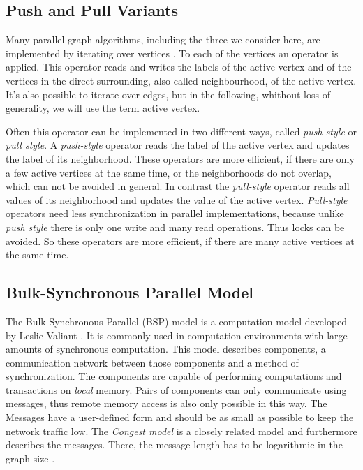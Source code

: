 \subsection{Push and Pull Variants}
Many parallel graph algorithms, including the three we consider here, are implemented by iterating over vertices \cite{tao}.
To each of the vertices an operator is applied.
This operator reads and writes the labels of the active vertex and of the vertices in the direct surrounding, also called neighbourhood, of the active vertex.
It's also possible to iterate over edges, but in the following, whithout loss of generality, we will use the term active vertex.

Often this operator can be implemented in two different ways, called \emph{push style} or \emph{pull style}.
A \emph{push-style} operator reads the label of the active vertex and updates the label of its neighborhood.
These operators are more efficient, if there are only a few active vertices at the same time, or the neighborhoods do not overlap, which can not be avoided in general.
In contrast the \emph{pull-style} operator reads all values of its neighborhood and updates the value of the active vertex.
\emph{Pull-style} operators need less synchronization in parallel implementations, because unlike \emph{push style} there is only one write and many read operations.
Thus locks can be avoided.
So these operators are more efficient, if there are many active vertices at the same time.

\subsection{Bulk-Synchronous Parallel Model}
\label{sec:bsp}
The Bulk-Synchronous Parallel (BSP) model is a computation model developed by Leslie Valiant \cite{bsp}. It is commonly used in computation environments with large amounts of synchronous computation.
This model describes components, a communication network between those components and a method of synchronization.
The components are capable of performing computations and transactions on \emph{local} memory. Pairs of components can only communicate using messages, thus remote memory access is also only possible in this way.
The Messages have a user-defined form and should be as small as possible to keep the network traffic low. The \emph{Congest model} is a closely related model and furthermore describes the messages. There, the message length has to be logarithmic in the graph size \cite{congestModel}.

